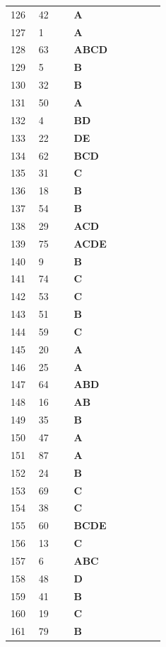 \documentclass[UTF8,fontset=windows,11pt]{ctexart}
\begin{document}
\begin{longtable}{p{0.16\linewidth}p{0.2\linewidth}p{0.52\linewidth}}
126 & 42 & \textbf{\textcolor{answergreen}{A}} \\
127 & 1 & \textbf{\textcolor{answergreen}{A}} \\
128 & 63 & \textbf{\textcolor{answergreen}{ABCD}} \\
129 & 5 & \textbf{\textcolor{answergreen}{B}} \\
130 & 32 & \textbf{\textcolor{answergreen}{B}} \\
131 & 50 & \textbf{\textcolor{answergreen}{A}} \\
132 & 4 & \textbf{\textcolor{answergreen}{BD}} \\
133 & 22 & \textbf{\textcolor{answergreen}{DE}} \\
134 & 62 & \textbf{\textcolor{answergreen}{BCD}} \\
135 & 31 & \textbf{\textcolor{answergreen}{C}} \\
136 & 18 & \textbf{\textcolor{answergreen}{B}} \\
137 & 54 & \textbf{\textcolor{answergreen}{B}} \\
138 & 29 & \textbf{\textcolor{answergreen}{ACD}} \\
139 & 75 & \textbf{\textcolor{answergreen}{ACDE}} \\
140 & 9 & \textbf{\textcolor{answergreen}{B}} \\
141 & 74 & \textbf{\textcolor{answergreen}{C}} \\
142 & 53 & \textbf{\textcolor{answergreen}{C}} \\
143 & 51 & \textbf{\textcolor{answergreen}{B}} \\
144 & 59 & \textbf{\textcolor{answergreen}{C}} \\
145 & 20 & \textbf{\textcolor{answergreen}{A}} \\
146 & 25 & \textbf{\textcolor{answergreen}{A}} \\
147 & 64 & \textbf{\textcolor{answergreen}{ABD}} \\
148 & 16 & \textbf{\textcolor{answergreen}{AB}} \\
149 & 35 & \textbf{\textcolor{answergreen}{B}} \\
150 & 47 & \textbf{\textcolor{answergreen}{A}} \\
151 & 87 & \textbf{\textcolor{answergreen}{A}} \\
152 & 24 & \textbf{\textcolor{answergreen}{B}} \\
153 & 69 & \textbf{\textcolor{answergreen}{C}} \\
154 & 38 & \textbf{\textcolor{answergreen}{C}} \\
155 & 60 & \textbf{\textcolor{answergreen}{BCDE}} \\
156 & 13 & \textbf{\textcolor{answergreen}{C}} \\
157 & 6 & \textbf{\textcolor{answergreen}{ABC}} \\
158 & 48 & \textbf{\textcolor{answergreen}{D}} \\
159 & 41 & \textbf{\textcolor{answergreen}{B}} \\
160 & 19 & \textbf{\textcolor{answergreen}{C}} \\
161 & 79 & \textbf{\textcolor{answergreen}{B}} \\
\end{longtable}
\end{document}
